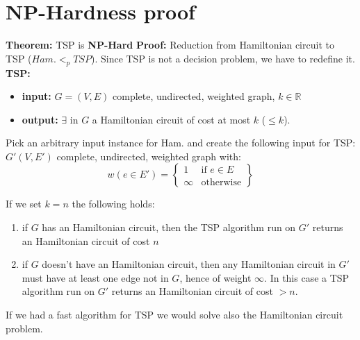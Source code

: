 \section{NP-Hardness proof}
\textbf{Theorem:} TSP is \textbf{NP-Hard}\newline\newline
\textbf{Proof:}\newline
Reduction from Hamiltonian circuit to TSP ($Ham. <_p TSP$). Since TSP is not a decision problem, we have to redefine it.\newline\newline
\textbf{TSP:}
\begin{itemize}
    \item \textbf{input:} $G=(V, E)$ complete, undirected, weighted graph, $k \in \mathbb{R}$

    \item \textbf{output:} $\exists$ in $G$ a Hamiltonian circuit of cost at most $k$ ($\leq k$).
\end{itemize}
Pick an arbitrary input instance for Ham. and create the following input for TSP: $G'(V, E')$ complete, undirected, weighted graph with:
\[w(e \in E') = \left\{\begin{array}{lr}
                    1 & \text{if } e \in E \\
                    \infty & \text{otherwise}
                \end{array}\right\}\]

If we set $k=n$ the following holds:
\begin{enumerate}
    \item if $G$ has an Hamiltonian circuit, then the TSP algorithm run on $G'$ returns an Hamiltonian circuit of cost $n$

    \item if $G$ doesn't have an Hamiltonian circuit, then any Hamiltonian circuit in $G'$ must have at least one edge not in $G$, hence of weight $\infty$. In this case a TSP algorithm run on $G'$ returns an Hamiltonian circuit of cost $> n$.
\end{enumerate}
If we had a fast algorithm for TSP we would solve also the Hamiltonian circuit problem.

